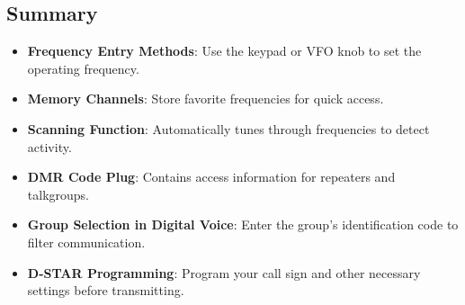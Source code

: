 
\subsection*{Summary}
\begin{itemize}
    \item \textbf{Frequency Entry Methods}: Use the keypad or VFO knob to set the operating frequency.
    \item \textbf{Memory Channels}: Store favorite frequencies for quick access.
    \item \textbf{Scanning Function}: Automatically tunes through frequencies to detect activity.
    \item \textbf{DMR Code Plug}: Contains access information for repeaters and talkgroups.
    \item \textbf{Group Selection in Digital Voice}: Enter the group’s identification code to filter communication.
    \item \textbf{D-STAR Programming}: Program your call sign and other necessary settings before transmitting.
\end{itemize}
